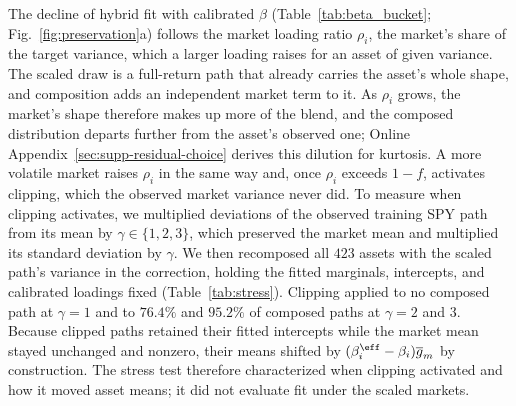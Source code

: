 The decline of hybrid fit with calibrated $\beta$
(Table~\ref{tab:beta_bucket}; Fig.~\ref{fig:preservation}a) follows
the market loading ratio $\rho_i$, the market's share of the target
variance, which a larger loading raises for an asset of given
variance. The scaled draw is a full-return path that already carries
the asset's whole shape, and composition adds an independent market
term to it. As $\rho_i$ grows, the market's shape therefore makes up
more of the blend, and the composed distribution departs further from
the asset's observed one; Online
Appendix~\ref{sec:supp-residual-choice} derives this dilution for
kurtosis. A more volatile market raises $\rho_i$ in the same way and,
once $\rho_i$ exceeds $1-f$, activates clipping, which the observed
market variance never did. To measure when clipping activates, we
multiplied deviations of the observed training SPY path from its mean
by $\gamma\in\{1,2,3\}$, which preserved the market mean and
multiplied its standard deviation by $\gamma$. We then recomposed all
$423$ assets with the scaled path's variance in the correction,
holding the fitted marginals, intercepts, and calibrated loadings
fixed (Table~\ref{tab:stress}). Clipping applied to no composed path
at $\gamma=1$ and to $76.4\%$ and $95.2\%$ of composed paths at
$\gamma=2$ and $3$. Because clipped paths retained their fitted
intercepts while the market mean stayed unchanged and nonzero, their
means shifted by $(\beta_i^{\eff}-\beta_i)\overline{g}_m$ by
construction. The stress test therefore characterized when clipping
activated and how it moved asset means; it did not evaluate fit under
the scaled markets.
